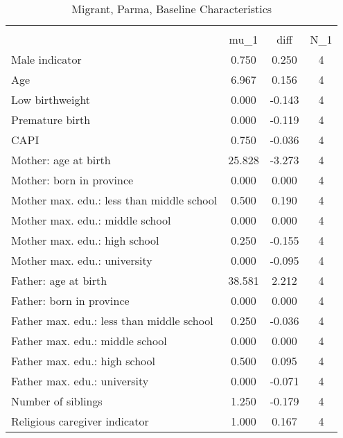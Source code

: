 \begin{table}[htbp]\centering
\def\sym#1{\ifmmode^{#1}\else\(^{#1}\)\fi}
\caption{Migrant, Parma, Baseline Characteristics}
\begin{tabular}{l*{1}{ccc}}
\toprule
                    &\multicolumn{3}{c}{}                           \\
                    &        mu\_1         &        diff&         N\_1\\
\midrule
Male indicator      &       0.750         &       0.250&           4\\
Age                 &       6.967         &       0.156&           4\\
Low birthweight     &       0.000         &      -0.143&           4\\
Premature birth     &       0.000         &      -0.119&           4\\
CAPI                &       0.750         &      -0.036&           4\\
Mother: age at birth&      25.828         &      -3.273&           4\\
Mother: born in province&       0.000         &       0.000&           4\\
Mother max. edu.: less than middle school&       0.500         &       0.190&           4\\
Mother max. edu.: middle school&       0.000         &       0.000&           4\\
Mother max. edu.: high school&       0.250         &      -0.155&           4\\
Mother max. edu.: university&       0.000         &      -0.095&           4\\
Father: age at birth&      38.581         &       2.212&           4\\
Father: born in province&       0.000         &       0.000&           4\\
Father max. edu.: less than middle school&       0.250         &      -0.036&           4\\
Father max. edu.: middle school&       0.000         &       0.000&           4\\
Father max. edu.: high school&       0.500         &       0.095&           4\\
Father max. edu.: university&       0.000         &      -0.071&           4\\
Number of siblings  &       1.250         &      -0.179&           4\\
Religious caregiver indicator&       1.000         &       0.167&           4\\

\end{tabular}
\end{table}
